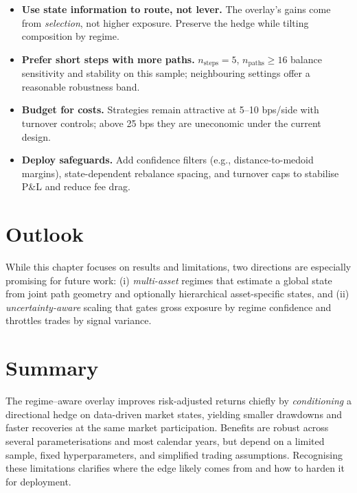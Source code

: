 \begin{itemize}
\item \textbf{Use state information to route, not lever.} The overlay’s gains come from \emph{selection}, not higher exposure. Preserve the hedge while tilting composition by regime.
\item \textbf{Prefer short steps with more paths.} \(n_{\text{steps}}{=}5\), \(n_{\text{paths}}\ge 16\) balance sensitivity and stability on this sample; neighbouring settings offer a reasonable robustness band.
\item \textbf{Budget for costs.} Strategies remain attractive at 5–10 bps/side with turnover controls; above 25 bps they are uneconomic under the current design.
\item \textbf{Deploy safeguards.} Add confidence filters (e.g., distance-to-medoid margins), state-dependent rebalance spacing, and turnover caps to stabilise P\&L and reduce fee drag.
\end{itemize}

\section{Outlook}\label{sec:disc:outlook}
While this chapter focuses on results and limitations, two directions are especially promising for future work: (i) \emph{multi-asset} regimes that estimate a global state from joint path geometry and optionally hierarchical asset-specific states, and (ii) \emph{uncertainty-aware} scaling that gates gross exposure by regime confidence and throttles trades by signal variance.

\section{Summary}\label{sec:disc:summary}
The regime–aware overlay improves risk-adjusted returns chiefly by \emph{conditioning} a directional hedge on data-driven market states, yielding smaller drawdowns and faster recoveries at the same market participation. Benefits are robust across several parameterisations and most calendar years, but depend on a limited sample, fixed hyperparameters, and simplified trading assumptions. Recognising these limitations clarifies where the edge likely comes from and how to harden it for deployment.
